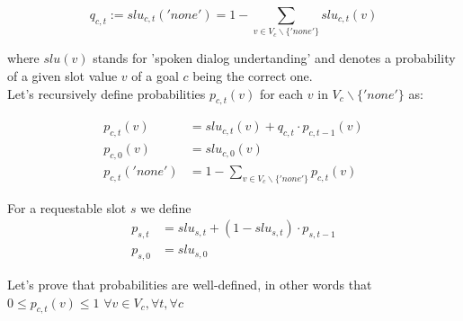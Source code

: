 \documentclass[12pt,titlepage,a4paper]{article}
\begin{document}
\begin{equation}
    \label{eqn:q_c_t}
    q_{c,t} := slu_{c,t}('none') = 1 - \sum_{v \in V_c \backslash \{'none'\}}slu_{c,t}(v)
\end{equation}

\noindent where $slu(v)$ stands for 'spoken dialog undertanding' and denotes a probability of a given slot value $v$ of a goal $c$ being the correct one.\\

\noindent Let's recursively define probabilities $p_{c,t}(v)$ for each $v$ in $V_c \backslash \{'none'\}$ as: 

\begin{align}
    \label{eqn:p_c_t}
    p_{c,t}(v) &=slu_{c,t}(v) + q_{c,t} \cdot p_{c,t-1}(v) \\
    \label{eqn:p_c_0}
    p_{c,0}(v) &= slu_{c,0}(v) \\
    \label{eqn:p_c_t_none}
    p_{c,t}('none') &= 1 - \sum_{v \in V_c \backslash \{'none'\}}p_{c,t}(v)
\end{align}

\noindent For a requestable slot $s$ we define 
\begin{align}
    \label{eqn:p_s_t}
    p_{s,t} &= slu_{s,t} + (1 - slu_{s, t})\cdot p_{s,t-1} \\
    \label{eqn:p_s_0}
    p_{s,0} &= slu_{s,0}
\end{align}

\noindent Let's prove that probabilities are well-defined, in other words that $0 \leq p_{c,t}(v) \leq 1$ $\forall v \in V_c, \forall t, \forall c$
\end{document}
